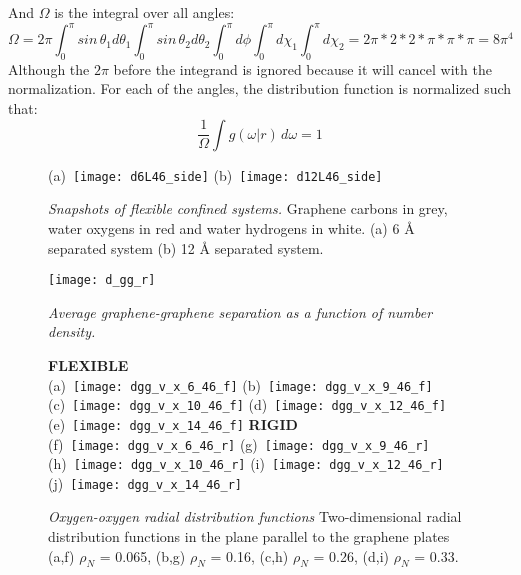 \documentclass[12pt]{article}
\begin{document}
And \(\Omega\) is the integral over all angles:
\begin{equation}
    \Omega = 2\pi \int_0^\pi sin \, \theta_1 d \theta_1 \int_0^\pi sin \, \theta_2 d \theta_2 \int_0^\pi d\phi\int_0^\pi d\chi_1 \int_0^\pi d\chi_2 = 2 \pi * 2 * 2 * \pi * \pi * \pi = 8 \pi^4
\end{equation}
Although the \(2\pi\) before the integrand is ignored because it will cancel with the normalization. For each of the angles, the distribution function is normalized such that:
\begin{equation}
    \frac{1}{\Omega} \int g(\omega | r ) \, d \omega = 1  
\end{equation}

\begin{figure}[h!]
	\centering
	(a)~\texttt{[image: d6L46\_side]} 
	(b)~\texttt{[image: d12L46\_side]}
	\caption{\textit{Snapshots of flexible confined systems.} Graphene carbons in grey, water oxygens in red and water hydrogens in white. (a) 6 \r A separated system (b) 12 \r A separated system. }
	\label{fig:snapshot}
\end{figure}

\begin{figure}[h!]
	\centering
	\texttt{[image: d\_gg\_r]} 
	\caption{\textit{Average graphene-graphene separation as a function of number density.}}
	\label{fig:dgg}
\end{figure}

\begin{figure}[h!]
	\centering
	\textbf{FLEXIBLE} \\
	(a)~\texttt{[image: dgg\_v\_x\_6\_46\_f]} 
	(b)~\texttt{[image: dgg\_v\_x\_9\_46\_f]}
	(c)~\texttt{[image: dgg\_v\_x\_10\_46\_f]}
	(d)~\texttt{[image: dgg\_v\_x\_12\_46\_f]}
	(e)~\texttt{[image: dgg\_v\_x\_14\_46\_f]}
	\textbf{RIGID} \\
	(f)~\texttt{[image: dgg\_v\_x\_6\_46\_r]} 
	(g)~\texttt{[image: dgg\_v\_x\_9\_46\_r]}
	(h)~\texttt{[image: dgg\_v\_x\_10\_46\_r]}
	(i)~\texttt{[image: dgg\_v\_x\_12\_46\_r]}
	(j)~\texttt{[image: dgg\_v\_x\_14\_46\_r]}
	\caption{\textit{Oxygen-oxygen radial distribution functions} Two-dimensional radial distribution functions in the plane parallel to the graphene plates (a,f) \(\rho_N\) = 0.065, (b,g) \(\rho_N\) = 0.16, (c,h) \(\rho_N\) = 0.26, (d,i) \(\rho_N\) = 0.33.}
	\label{fig:density_vs_dgg}
\end{figure}
\end{document}
